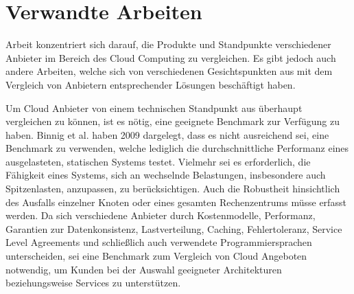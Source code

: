 \section{Verwandte Arbeiten}
\label{sec_related_work}

 Arbeit konzentriert sich darauf, die Produkte und Standpunkte verschiedener Anbieter im Bereich des Cloud Computing zu vergleichen. 
Es gibt jedoch auch andere Arbeiten, welche sich von verschiedenen Gesichtspunkten aus mit dem Vergleich von Anbietern entsprechender Lösungen beschäftigt haben. 

%

Um Cloud Anbieter von einem technischen Standpunkt aus überhaupt vergleichen zu können, ist es nötig, eine geeignete Benchmark zur Verfügung zu haben. 
Binnig et al.\cite{binnig2009} haben 2009 dargelegt, dass es nicht ausreichend sei, eine Benchmark zu verwenden, welche lediglich die durchschnittliche Performanz eines ausgelasteten, statischen Systems testet. 
Vielmehr sei es erforderlich, die Fähigkeit eines Systems, sich an wechselnde Belastungen, insbesondere auch Spitzenlasten, anzupassen, zu berücksichtigen. 
Auch die Robustheit hinsichtlich des Ausfalls einzelner Knoten oder eines gesamten Rechenzentrums müsse erfasst werden. 
Da sich verschiedene Anbieter durch Kostenmodelle, Performanz, Garantien zur Datenkonsistenz, Lastverteilung, Caching, Fehlertoleranz, Service Level Agreements und schließlich auch verwendete Programmiersprachen unterscheiden, sei eine Benchmark zum Vergleich von Cloud Angeboten notwendig, um Kunden bei der Auswahl geeigneter Architekturen beziehungsweise Services zu unterstützen. 

